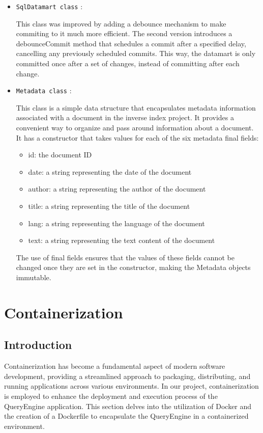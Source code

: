 \documentclass{article}
\begin{document}
\begin{itemize}

\item
\texttt{SqlDatamart class} :

This class was improved by adding a debounce mechanism to make commiting to it much more efficient.
The second version introduces a debounceCommit method that schedules a commit after a specified delay, cancelling any previously scheduled commits.
This way, the datamart is only committed once after a set of changes, instead of committing after each change.

\item
\texttt{Metadata class} :

This class is a simple data structure that encapsulates metadata information associated with a document in the inverse index project.
It provides a convenient way to organize and pass around information about a document.
It has a constructor that takes values for each of the six metadata final fields:
\begin{itemize}
    \item 
    id: the document ID
    \item 
    date: a string representing the date of the document
    \item 
    author: a string representing the author of the document
    \item 
    title: a string representing the title of the document
    \item 
    lang: a string representing the language of the document
    \item 
    text: a string representing the text content of the document
\end{itemize}

The use of final fields ensures that the values of these fields cannot be changed once they are set in the constructor, making the Metadata objects immutable.
\end{itemize}

\section{Containerization}
\subsection{Introduction}
Containerization has become a fundamental aspect of modern software development, providing a streamlined approach to packaging, distributing, and running applications across various environments. In our project, containerization is employed to enhance the deployment and execution process of the QueryEngine application. This section delves into the utilization of Docker and the creation of a Dockerfile to encapsulate the QueryEngine in a containerized environment.
\end{document}
